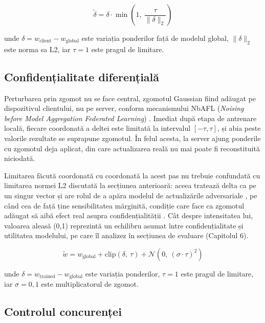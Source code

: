\documentclass[12pt,a4paper]{report}
\begin{document}
\begin{equation}
\tilde{\delta} = \delta \cdot \min\!\left(1,\ \frac{\tau}{\|\delta\|_2}\right)
\label{eq:clipping}
\end{equation}

\noindent unde $\delta = w_{\mathrm{client}} - w_{\mathrm{global}}$ este variația ponderilor față de modelul global, $\|\delta\|_2$ este norma sa L2, iar $\tau = 1$ este pragul de limitare.

\subsection{Confidențialitate diferențială}

Perturbarea prin zgomot nu se face central, zgomotul Gaussian fiind adăugat pe dispozitivul clientului, nu pe server, conform mecanismului NbAFL (\textit{Noising before Model Aggregation Federated Learning}) \cite{wei2020nbafl}. Imediat după etapa de antrenare locală, fiecare coordonată a deltei este limitată la intervalul $[-\tau, \tau]$, și abia peste valorile rezultate se suprapune zgomotul. În felul acesta, la server ajung ponderile cu zgomotul deja aplicat, din care actualizarea reală nu mai poate fi reconstituită niciodată.

Limitarea făcută coordonată cu coordonată la acest pas nu trebuie confundată cu limitarea normei L2 discutată la secțiunea anterioară: aceea tratează delta ca pe un singur vector și are rolul de a apăra modelul de actualizările adversariale \cite{lyu2020threats}, pe când cea de față ține sensibilitatea mărginită, condiție care face ca zgomotul adăugat să aibă efect real asupra confidențialității \cite{shokri2017membership}. Cât despre intensitatea lui, valoarea aleasă (0,1) reprezintă un echilibru asumat între confidențialitate și utilitatea modelului, pe care îl analizez în secțiunea de evaluare (Capitolul 6).

\begin{equation}
\tilde{w} = w_{\mathrm{global}} + \mathrm{clip}(\delta,\ \tau) + \mathcal{N}\!\left(0,\ (\sigma \cdot \tau)^2\right)
\label{eq:dp}
\end{equation}

\noindent unde $\delta = w_{\mathrm{trained}} - w_{\mathrm{global}}$ este variația ponderilor, $\tau = 1$ este pragul de limitare, iar $\sigma = 0{,}1$ este multiplicatorul de zgomot.

\subsection{Controlul concurenței}
\end{document}
